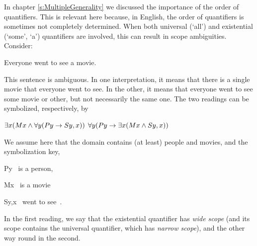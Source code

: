 In chapter \ref{s:MultipleGenerality} we discussed the importance of the order of quantifiers.  This is relevant here because, in English, the order of quantifiers is sometimes not completely determined.  When both universal (`all') and existential (`some', `a') quantifiers are  involved, this can result in scope ambiguities. Consider:
\begin{earg}
	\item[\ex{everya}] Everyone went to see a movie.
\end{earg}
This sentence is ambiguous.  In one interpretation, it means that there is a single movie that everyone went to see. In the  other, it means that everyone went to see some movie or other, but not necessarily the same one. The two readings can be symbolized, respectively, by
\begin{earg}
	\prem $\exists x({M}{x} \mathbin{\wedge} \forall y({P}{y} \rightarrow {S}{y,x}))$
	\prem $\forall y({P}{y} \rightarrow \exists x({M}{x} \mathbin{\wedge} {S}{y,x}))$
\end{earg}
We assume here that the domain contains (at least) people and movies, and the symbolization key,
\begin{ekey}
	\item[{P}{y}] ~is a person,
	\item[{M}{x}] ~is a movie
	\item[{S}{y,x}] ~went to see~.
\end{ekey}
In the first reading, we say that the existential quantifier has \emph{wide scope} (and its scope contains the universal quantifier, which has \emph{narrow scope}), and the other way round in the second.

